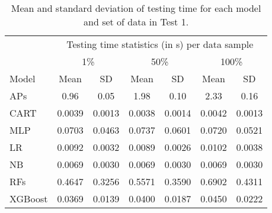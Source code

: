 \begin{table}[htbp!]
\caption{Mean and standard deviation of testing time for each model and set of data in Test 1.}
\label{tab:testing_exp1}
\begin{tabular}{lcccccc}
\toprule
& \multicolumn{6}{c}{Testing time statistics (in s) per data sample} \\
\cmidrule(lr){2-7}
& \multicolumn{2}{c}{1\%} & \multicolumn{2}{c}{50\%} & \multicolumn{2}{c}{100\%} \\
\cmidrule(lr){2-7}
Model & Mean & SD & Mean & SD & Mean & SD \\
\midrule
APs & 0.96 & 0.05 & 1.98 & 0.10 & 2.33 & 0.16 \\
CART & 0.0039 & 0.0013 & 0.0038 & 0.0014 & 0.0042 & 0.0013 \\
MLP & 0.0703 & 0.0463 & 0.0737 & 0.0601 & 0.0720 & 0.0521 \\
LR & 0.0092 & 0.0032 & 0.0089 & 0.0026 & 0.0102 & 0.0038 \\
NB & 0.0069 & 0.0030 & 0.0069 & 0.0030 & 0.0069 & 0.0030 \\
RFs & 0.4647 & 0.3256 & 0.5571 & 0.3590 & 0.6902 & 0.4311 \\
XGBoost & 0.0369 & 0.0139 & 0.0400 & 0.0187 & 0.0450 & 0.0222 \\
\bottomrule
\end{tabular}
\end{table}